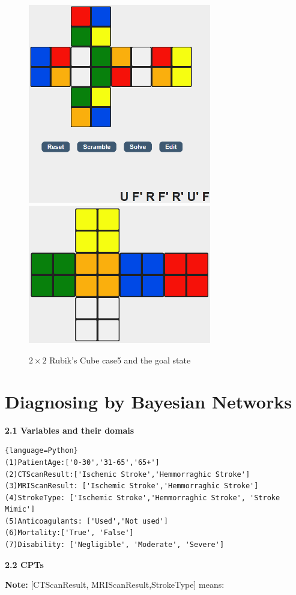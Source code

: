 ﻿\documentclass[a4paper, 11pt]{article}
\begin{document}
\begin{figure}[ht]
  \centering
  \includegraphics[width=8cm]{Pic/case5}
  \quad
  \includegraphics[width=8cm]{Pic/goal}
  \caption{$2\times 2$ Rubik's Cube case5 and the goal state}
\end{figure}

\newpage
\section{Diagnosing by Bayesian Networks}
\label{sec:bayesian-networks}
\textbf{2.1 Variables and their domais}
\begin{lstlisting}{language=Python}
(1)PatientAge:['0-30','31-65','65+']
(2)CTScanResult:['Ischemic Stroke','Hemmorraghic Stroke']
(3)MRIScanResult: ['Ischemic Stroke','Hemmorraghic Stroke']
(4)StrokeType: ['Ischemic Stroke','Hemmorraghic Stroke', 'Stroke Mimic']
(5)Anticoagulants: ['Used','Not used']
(6)Mortality:['True', 'False']
(7)Disability: ['Negligible', 'Moderate', 'Severe']
\end{lstlisting}
\textbf{2.2 CPTs}

\textbf{Note:} [CTScanResult, MRIScanResult,StrokeType] means:
\end{document}
